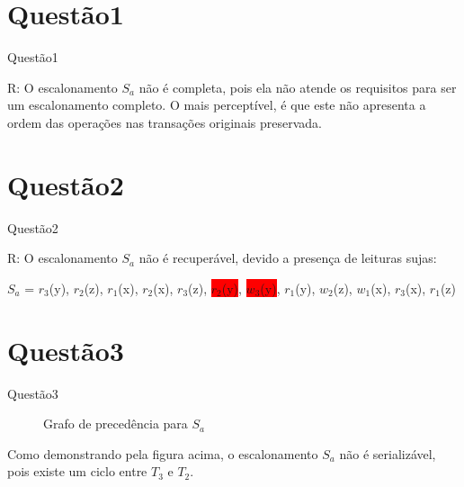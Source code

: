 \documentclass[aspectratio=169]{beamer}
\begin{document}
    \section{Questão1}

    \begin{frame}{Questão1}

        R: O escalonamento $S_a$ não é completa, pois ela não atende 
        os requisitos para ser um escalonamento completo. O mais perceptível, é que este 
        não apresenta a ordem das operações nas transações originais preservada.

    \end{frame}

    \section{Questão2}

    \begin{frame}{Questão2}

        R: O escalonamento $S_a$ não é recuperável, devido a presença de leituras sujas: \newline

        $S_a$ = $r_3$(y), $r_2$(z), $r_1$(x), $r_2$(x), $r_3$(z), \colorbox{red}{$r_2$(y)}, \colorbox{red}{$w_3$(y)},
        $r_1$(y), $w_2$(z), $w_1$(x), $r_3$(x), $r_1$(z)

    \end{frame}

    \section{Questão3}

    \begin{frame}{Questão3}

        \begin{figure}[ht]
            \centering
            \caption{Grafo de precedência para $S_a$}
          \end{figure}
          Como demonstrando pela figura acima, o escalonamento $S_a$ não é 
          serializável, pois existe um ciclo entre $T_3$ e $T_2$.
    \end{frame}
\end{document}
